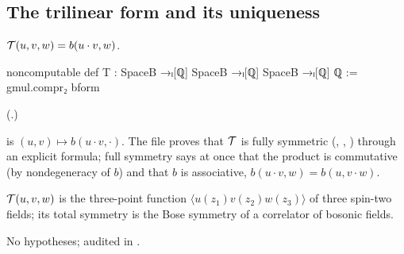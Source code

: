 \subsection{The trilinear form and its uniqueness}

\begin{definition}\label{ch21:def:T}
$\mathcal{T}(u,v,w)=b(u\cdot v,w)$.
\end{definition}
\begin{leancode}
noncomputable def T : SpaceB →ₗ[ℚ] SpaceB →ₗ[ℚ] SpaceB →ₗ[ℚ] ℚ := gmul.compr₂ bform
\end{leancode}
(.)
\begin{dictionary}
 is $(u,v)\mapsto b(u\cdot v,\cdot)$.  The file proves that $\mathcal{T}$ is fully
symmetric (, , ) through an explicit formula; full symmetry
says at once that the product is commutative (by nondegeneracy of $b$) and that $b$ is associative,
$b(u\cdot v,w)=b(u,v\cdot w)$.
\end{dictionary}
\begin{physics}
$\mathcal{T}(u,v,w)$ is the three-point function $\langle u(z_1)v(z_2)w(z_3)\rangle$ of three spin-two
fields; its total symmetry is the Bose symmetry of a correlator of bosonic fields.
\end{physics}
\begin{status}
No hypotheses; audited in .
\end{status}

